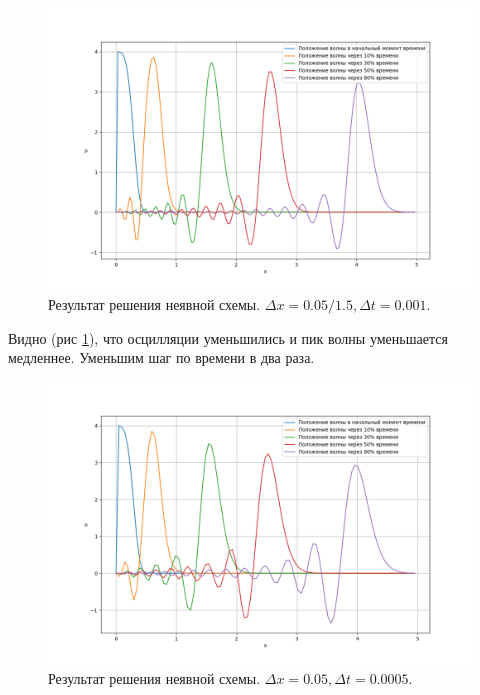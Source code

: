\begin{figure}[h]  %
	\centering
	\includegraphics[height=0.7\textwidth]{imgs/implicit_1.5x.png}  %
	\caption{Результат решения неявной схемы. $\Delta x = 0.05 / 1.5, \Delta t = 0.001$.}  %
	\label{fig:implicit_1.5x}  %
\end{figure}
Видно (рис \ref{fig:implicit_1.5x}), что осцилляции уменьшились и пик волны уменьшается медленнее.
\newpage
Уменьшим шаг по времени в два раза. 
\begin{figure}[h]  %
	\centering
	\includegraphics[height=0.7\textwidth]{imgs/implicit_2t.png}  %
	\caption{Результат решения неявной схемы. $\Delta x = 0.05 , \Delta t = 0.0005$.}  %
	\label{fig:implicit_2t}  %
\end{figure}

